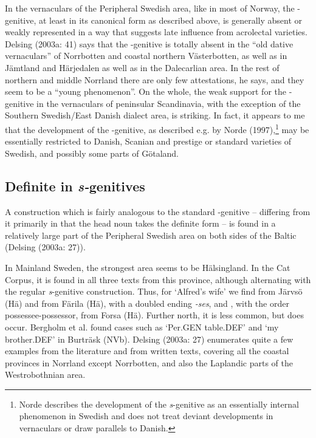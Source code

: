 In the vernaculars of the Peripheral Swedish area, like in most of Norway, the -genitive, at least in its canonical form as described above, is generally absent or weakly represented in a way that suggests late influence from acrolectal varieties. Delsing (2003a: 41) says that the -genitive is totally absent in the “old dative vernaculars” of Norrbotten and coastal northern Västerbotten, as well as in Jämtland and Härjedalen as well as in the Dalecarlian area. In the rest of northern and middle Norrland there are only few attestations, he says, and they seem to be a “young phenomenon”. On the whole, the weak support for the -genitive in the vernaculars of peninsular Scandinavia, with the exception of the Southern Swedish/East Danish dialect area, is striking. In fact, it appears to me that the development of the -genitive, as described e.g. by Norde (1997),\footnote{ Norde describes the development of the \textit{s}{}-genitive as an essentially internal phenomenon in Swedish and does not treat deviant developments in vernaculars or draw parallels to Danish.} may be essentially restricted to Danish, Scanian and prestige or standard varieties of Swedish, and possibly some parts of Götaland. 

\subsection[Definite in s{}-genitives]{Definite in \textit{s-}genitives}
\label{bkm:Ref137614892}%
A construction which is fairly analogous to the standard -genitive – differing from it primarily in that the head noun takes the definite form – is found in a relatively large part of the Peripheral Swedish area on both sides of the Baltic (Delsing (2003a: 27)).

In Mainland Sweden, the strongest area seems to be Hälsingland. In the Cat Corpus, it is found in all three texts from this province, although alternating with the regular \textit{s}{}-genitive construction. Thus, for ‘Alfred’s wife’ we find  from Järvsö (Hä) and  from Färila (Hä), with a doubled ending\textit{ {}-ses}, and , with the order possessee-possessor, from Forsa (Hä). Further north, it is less common, but does occur.  Bergholm et al. found cases such as ‘Per.GEN table.DEF’ and  ‘my brother.DEF’ in Burträsk (NVb). Delsing (2003a: 27) enumerates quite a few examples from the literature and from written texts, covering all the coastal provinces in Norrland except Norrbotten, and also the Laplandic parts of the Westrobothnian area. 

